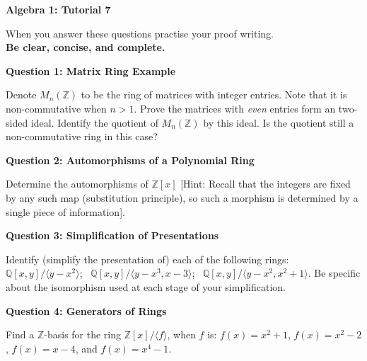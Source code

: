 \documentclass[11pt,twoside, a4paper]{report}
\theoremstyle{plain}
\theoremstyle{definition}
\begin{document}
\begin{center}
 \noindent\makebox[\linewidth]{\rule{14cm}{1.5pt}} 
{\bf Algebra 1: Tutorial 7 }
 \noindent\makebox[\linewidth]{\rule{14cm}{1.5pt}}  
 \noindent\makebox[\linewidth]{\rule{14cm}{3pt}}
\end{center}

\noindent When you answer these questions practise your proof writing.\\
  {\bf Be clear, concise, and complete.}
  

\begin{center}
{\bf Question 1: Matrix Ring Example}
\end{center}

Denote $M_{n}(\mathbb{Z})$ to be the ring of matrices with integer entries. Note that it is non-commutative when $n>1$. Prove the matrices with \emph{even} entries form an two-sided ideal. Identify the quotient of $M_{n}(\mathbb{Z})$ by this ideal. Is the quotient still a non-commutative ring in this case?



\begin{center}
{\bf Question 2: Automorphisms of a Polynomial Ring}
\end{center}

Determine the automorphisms of $\mathbb{Z}[x]$ [Hint: Recall that the integers are fixed by any such map (substitution principle), so such a morphism is determined by a single piece of information]. 



\begin{center}
{\bf Question 3: Simplification of Presentations}
\end{center} 

Identify (simplify the presentation of) each of the following rings: 
$\mathbb{Q}[x,y] / \langle y-x^{2} \rangle $; \
$\mathbb{Q}[x,y] / \langle y-x^{3},x-3 \rangle $; \
$\mathbb{Q}[x,y] / \langle y-x^{2},x^{2}+1 \rangle.$ Be specific about the isomorphism used at each stage of your simplification.




\begin{center}
{\bf Question 4: Generators of Rings}
\end{center}

Find a $\mathbb{Z}$-basis for the ring $\mathbb{Z}[x]/\langle f \rangle$, when $f$ is: $f(x)= x^{2} + 1$, 
$f(x)= x^{2} - 2$,
$f(x)= x - 4$, and
$f(x)= x^{4} - 1$.
\end{document}
